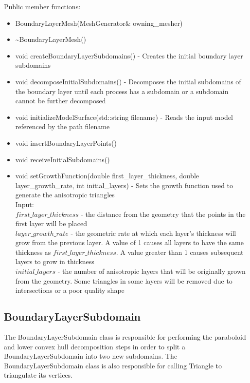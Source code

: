\documentclass[manuscript, screen]{acmart}
\begin{document}
Public member functions:
\begin{itemize}
\item BoundaryLayerMesh(MeshGenerator\& owning\_mesher)

\item \textasciitilde{}BoundaryLayerMesh()
%

\item void createBoundaryLayerSubdomains() - Creates the initial boundary layer subdomains

\item void decomposeInitialSubdomains() - Decomposes the initial subdomains of the boundary layer until each process has a subdomain or a subdomain cannot be further decomposed

\item void initializeModelSurface(std::string filename) - Reads the input model referenced by the path filename

\item void insertBoundaryLayerPoints()

\item void receiveInitialSubdomains()

\item void setGrowthFunction(double first\_layer\_thickness, double layer\_growth\_rate, int initial\_layers) - Sets the growth function used to generate the anisotropic triangles\\
Input:\\
$first\_layer\_thickness$ - the distance from the geometry that the points in the first layer will be placed\\
$layer\_growth\_rate$ - the geometric rate at which each layer's thickness will grow from the previous layer. A value of 1 causes all layers to have the same thickness as $first\_layer\_thickness$. A value greater than 1 causes subsequent layers to grow in thickness\\
$initial\_layers$ - the number of anisotropic layers that will be originally grown from the geometry. Some triangles in some layers will be removed due to intersections or a poor quality shape
\end{itemize}

\subsection{BoundaryLayerSubdomain}
The BoundaryLayerSubdomain class is responsible for performing the paraboloid and lower convex hull decomposition steps in order to split a BoundaryLayerSubdomain into two new subdomains. The BoundaryLayerSubdomain class is also responsible for calling Triangle to triangulate its vertices.
\end{document}
